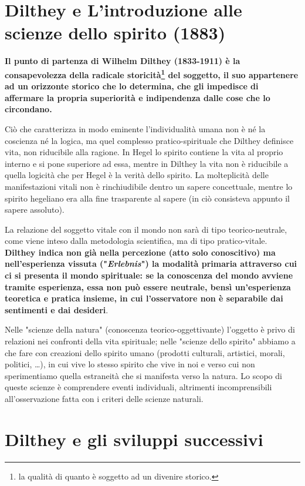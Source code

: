 \section{Dilthey e L'introduzione alle scienze dello spirito (1883)}

\textbf{Il punto di partenza di Wilhelm Dilthey (1833-1911) è la consapevolezza della radicale storicità\footnote{la qualità  di quanto è soggetto ad un divenire storico.} del soggetto, il suo appartenere ad un orizzonte storico che lo determina, che gli impedisce di affermare la propria superiorità e indipendenza dalle cose che lo circondano.}

Ciò che caratterizza  in modo eminente l'individualità umana non è né la coscienza né la logica, ma quel complesso pratico-spirituale che Dilthey definisce vita, non riducibile alla ragione. In Hegel lo spirito contiene la vita al proprio interno e si pone superiore ad essa, mentre in Dilthey la vita non è riducibile a quella logicità che per Hegel è la verità dello spirito. La molteplicità delle manifestazioni vitali non è rinchiudibile dentro un sapere concettuale, mentre lo spirito hegeliano era alla fine trasparente al sapere (in ciò consisteva appunto il sapere assoluto).

La relazione del soggetto vitale con il mondo non sarà di tipo teorico-neutrale, come viene inteso dalla metodologia scientifica, ma di tipo pratico-vitale. \textbf{Dilthey indica non già nella percezione (atto solo conoscitivo) ma nell'esperienza vissuta ("\textit{Erlebnis}") la modalità primaria attraverso cui ci si presenta il mondo spirituale: se la conoscenza del mondo avviene tramite esperienza, essa non può essere neutrale, bensì un'esperienza teoretica e pratica insieme, in cui l'osservatore non è separabile dai sentimenti e dai desideri}.

Nelle "scienze della natura" (conoscenza teorico-oggettivante) l'oggetto è privo di relazioni nei confronti della vita spirituale; nelle "scienze dello spirito" abbiamo a che fare con creazioni dello spirito umano (prodotti culturali, artistici, morali, politici, \dots), in cui vive lo stesso spirito che vive in noi e verso cui non sperimentiamo quella estraneità che si manifesta verso la natura. Lo scopo di queste scienze è comprendere eventi individuali, altrimenti incomprensibili all'osservazione fatta con i criteri delle scienze naturali.

\section{Dilthey e gli sviluppi successivi}

